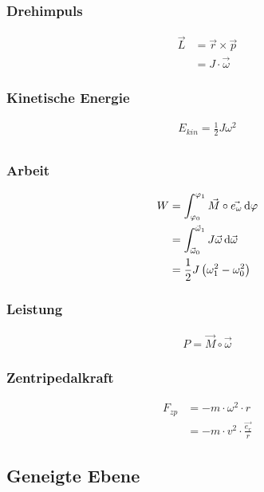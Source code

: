 \begin{multicols}{2}{}
\subsubsection*{Drehimpuls}
\begin{align*}
\vec{L}&=\vec{r}\times\vec{p} \\
&=J\cdot \vec{\omega}
\end{align*}

\subsubsection*{Kinetische Energie}
\begin{align*}
E_{kin}=\frac{1}{2}J\omega^2 \\
\end{align*}
\end{multicols}

\begin{multicols}{2}{}
\subsubsection*{Arbeit}
\begin{align*}
W &=\int_{\varphi_0}^{\varphi_1}\vec{M}\circ\vec{e_\omega}\mathop{}\!\mathrm{d} \varphi \\
&=\int_{\vec{\omega}_0}^{\vec{\omega}_1}J\vec{\omega}\mathop{}\!\mathrm{d}\vec{\omega}\\
&=\frac{1}{2}J\left(\omega_1^2-\omega_0^2\right)
\end{align*}

\subsubsection*{Leistung}
\begin{align*}
P=\vec{M}\circ\vec{\omega}
\end{align*}

\subsubsection*{Zentripedalkraft}
\begin{align*}
F_{zp}&=-m\cdot\omega^2\cdot r\\
&=-m\cdot v^2\cdot \frac{\vec{e_r}}{r}
\end{align*}
\end{multicols}


\subsection{Geneigte Ebene}

